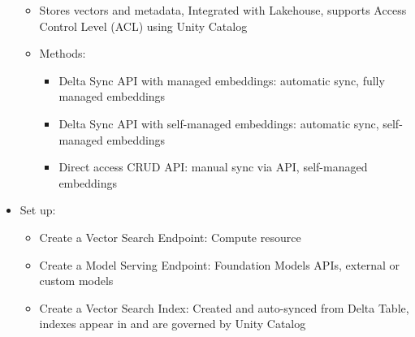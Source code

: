 \documentclass[11pt]{scrartcl}
\begin{document}
\begin{itemize}
	\begin{itemize}
		\item Stores vectors and metadata, Integrated with Lakehouse, supports Access Control Level (ACL) using Unity Catalog
		\item Methods:
		\begin{itemize}
			\item Delta Sync API with managed embeddings: automatic sync, fully managed embeddings
			\item Delta Sync API with self-managed embeddings: automatic sync, self-managed embeddings
			\item Direct access CRUD API: manual sync via API, self-managed embeddings
		\end{itemize}
	\end{itemize}
	\item Set up:
	\begin{itemize}
		\item Create a Vector Search Endpoint: Compute resource
		\item Create a Model Serving Endpoint: Foundation Models APIs, external or custom models
		\item Create a Vector Search Index: Created and auto-synced from Delta Table, indexes appear in and are governed by Unity Catalog
	\end{itemize}
\end{itemize}
\end{document}
